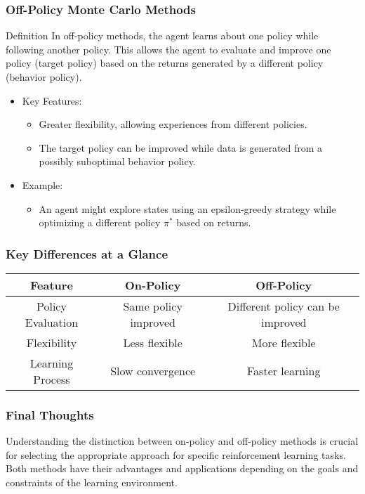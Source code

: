 \documentclass[aspectratio=169]{beamer}
\begin{document}
\begin{frame}[fragile]
  \frametitle{Off-Policy Monte Carlo Methods}
  \begin{block}{Definition}
    In off-policy methods, the agent learns about one policy while following another policy. This allows the agent to evaluate and improve one policy (target policy) based on the returns generated by a different policy (behavior policy).
  \end{block}
  \begin{itemize}
    \item Key Features:
    \begin{itemize}
      \item Greater flexibility, allowing experiences from different policies.
      \item The target policy can be improved while data is generated from a possibly suboptimal behavior policy.
    \end{itemize}
    \item Example:
    \begin{itemize}
      \item An agent might explore states using an epsilon-greedy strategy while optimizing a different policy $\pi^*$ based on returns.
    \end{itemize}
  \end{itemize}
\end{frame}

\begin{frame}[fragile]
  \frametitle{Key Differences at a Glance}
  \begin{center}
    \begin{tabular}{|c|c|c|}
      \hline
      \textbf{Feature} & \textbf{On-Policy} & \textbf{Off-Policy} \\
      \hline
      Policy Evaluation & Same policy improved & Different policy can be improved \\
      Flexibility & Less flexible & More flexible \\
      Learning Process & Slow convergence & Faster learning \\
      \hline
    \end{tabular}
  \end{center}
\end{frame}

\begin{frame}[fragile]
  \frametitle{Final Thoughts}
  Understanding the distinction between on-policy and off-policy methods is crucial for selecting the appropriate approach for specific reinforcement learning tasks. Both methods have their advantages and applications depending on the goals and constraints of the learning environment.
\end{frame}
\end{document}
